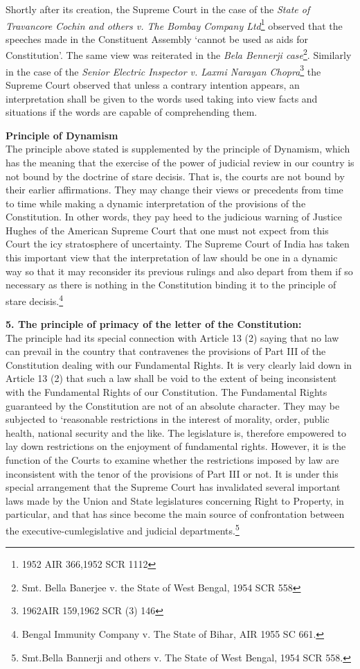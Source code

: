 \begin{multicols}{2}
\noi
Shortly after its creation, the Supreme Court in the case of the \textit{State of Travancore
Cochin and others v. The Bombay Company Ltd}\footnote{1952 AIR 366,1952 SCR 1112}
observed that the speeches made in
the Constituent Assembly ‘cannot be used as aids for Constitution’. The same view was reiterated in the \textit{Bela Bennerji case}\footnote{Smt. Bella Banerjee v. the State of West Bengal, 1954 SCR 558}. Similarly in the case of the \textit{Senior Electric
Inspector v. Laxmi Narayan Chopra}\footnote{1962AIR 159,1962 SCR (3) 146} the Supreme Court observed that unless a
contrary intention appears, an interpretation shall be given to the words used taking into
view facts and situations if the words are capable of comprehending them.

\noi
{\bf Principle of Dynamism}\\[0.2cm] The principle above stated is supplemented by the principle of Dynamism, which has
the meaning that the exercise of the power of judicial review in our country is not bound
by the doctrine of stare decisis. That is, the courts are not bound by their earlier
affirmations. They may change their views or precedents from time to time while
making a dynamic interpretation of the provisions of the Constitution. In other words,
they pay heed to the judicious warning of Justice Hughes of the American Supreme
Court that one must not expect from this Court the icy stratosphere of uncertainty. The
Supreme Court of India has taken this important view that the interpretation of law
should be one in a dynamic way so that it may reconsider its previous rulings and also
depart from them if so necessary as there is nothing in the Constitution binding it to the
principle of stare decisis.\footnote{Bengal Immunity Company v. The State of Bihar, AIR 1955 SC 661.}

\noi
{\bf 5. The principle of primacy of the letter of the Constitution:}\\[0.2cm]

\noi
The principle had its special connection with Article 13 (2) saying that no law can
prevail in the country that contravenes the provisions of Part III of the Constitution
dealing with our Fundamental Rights. It is very clearly laid down in Article 13 (2) that
such a law shall be void to the extent of being inconsistent with the Fundamental Rights
of our Constitution. The Fundamental Rights guaranteed by the Constitution are not of
an absolute character. They may be subjected to ‘reasonable restrictions in the interest
of morality, order, public health, national security and the like. The legislature is,
therefore empowered to lay down restrictions on the enjoyment of fundamental rights.
However, it is the function of the Courts to examine whether the restrictions imposed
by law are inconsistent with the tenor of the provisions of Part III or not. It is under this
special arrangement that the Supreme Court has invalidated several important laws
made by the Union and State legislatures concerning Right to Property, in particular, and that has since become the main source of confrontation between the executive-cumlegislative and judicial departments.\footnote{Smt.Bella Bannerji and others v. The State of West Bengal, 1954 SCR 558.}


\end{multicols}
